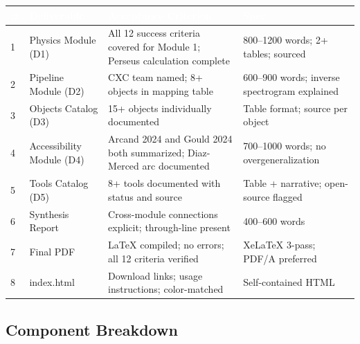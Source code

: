 \documentclass[11pt,letterpaper]{article}
\newcommand{\tableheader}[1]{\textbf{\sffamily\textcolor{white}{#1}}}
\begin{document}
\begin{center}
\begin{tabularx}{\textwidth}{C{0.5cm}L{3.5cm}L{4cm}L{5cm}}
\toprule
{}
\tableheader{\#} & \tableheader{Deliverable} & \tableheader{Acceptance Criterion} & \tableheader{Spec} \\
 & Physics Module (D1) & All 12 success criteria covered for Module 1; Perseus calculation complete & 800--1200 words; 2+ tables; sourced \\
2 & Pipeline Module (D2) & CXC team named; 8+ objects in mapping table & 600--900 words; inverse spectrogram explained \\
3 & Objects Catalog (D3) & 15+ objects individually documented & Table format; source per object \\
4 & Accessibility Module (D4) & Arcand 2024 and Gould 2024 both summarized; Diaz-Merced arc documented & 700--1000 words; no overgeneralization \\
5 & Tools Catalog (D5) & 8+ tools documented with status and source & Table + narrative; open-source flagged \\
6 & Synthesis Report & Cross-module connections explicit; through-line present & 400--600 words \\
7 & Final PDF & LaTeX compiled; no errors; all 12 criteria verified & XeLaTeX 3-pass; PDF/A preferred \\
8 & index.html & Download links; usage instructions; color-matched & Self-contained HTML \\
\bottomrule
\end{tabularx}
\end{center}

\subsection{Component Breakdown}
\end{document}
